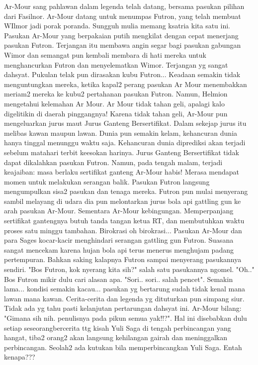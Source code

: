 \documentclass[a4paper,11pt,final]{article}
\begin{document}
Ar-Mour sang pahlawan dalam legenda telah datang, bersama pasukan pilihan dari Fasilnor. Ar-Mour datang untuk menumpas Futron, yang telah membuat WIlmor jadi porak poranda. Sungguh mulia memang ksatria kita satu ini.
Pasukan Ar-Mour yang berpakaian putih mengkilat dengan cepat menerjang pasukan Futron. Terjangan itu membawa angin segar bagi pasukan gabungan Wimor dan semangat pun kembali membara di hati mereka untuk menghancurkan Futron dan menyelematkan Wimor.
Terjangan yg sangat dahsyat. Pukulan telak pun dirasakan kubu Futron... Keadaan semakin tidak menguntungkan mereka, ketika kapal2 perang pasukan Ar Mour menembakkan meriam2 mereka ke kubu2 pertahanan pasukan Futron.
Namun, Helmion mengetahui kelemahan Ar Mour. Ar Mour tidak tahan geli, apalagi kalo digelitikin di daerah pinggangnya!
Karena tidak tahan geli, Ar-Mour pun mengeluarkan jurus maut Jurus Ganteng Bersertifikat. Dalam sekejap jurus itu melibas kawan maupun lawan. Dunia pun semakin kelam, kehancuran dunia hanya tinggal menunggu waktu saja.
Kehancuran dunia diprediksi akan terjadi sebelum matahari terbit keesokan harinya. Jurus Ganteng Bersertifikat tidak dapat dikalahkan pasukan Futron. Namun, pada tengah malam, terjadi keajaiban: masa berlaku sertifikat ganteng Ar-Mour habis!
Merasa mendapat momen untuk melakukan serangan balik. Pasukan Futron langsung mengumpulkan sisa2 pasukan dan tenaga mereka. Futron pun mulai menyerang sambil melayang di udara dia pun melontarkan jurus bola api gattling gun ke arah pasukan Ar-Mour.
Sementara Ar-Mour kebingungan. Memperpanjang sertifikat gantengnya butuh tanda tangan ketua RT, dan membutuhkan waktu proses satu minggu tambahan. Birokrasi oh birokrasi...
Pasukan Ar-Mour dan para Sages kocar-kacir menghindari serangan gattling gun Futron. Suasana sangat mencekam karena hujan bola api terus menerus menghujam padang pertempuran. Bahkan saking kalapnya Futron sampai menyerang pasukannya sendiri.
"Bos Futron, kok nyerang kita sih?" salah satu pasukannya ngomel. "Oh.." Bos Futron mikir dulu cari alasan apa. "Sori.. sori.. salah pencet".
Semakin lama... kondisi semakin kacau... pasukan yg bertarung sudah tidak kenal mana lawan mana kawan. Cerita-cerita dan legenda yg dituturkan pun simpang siur. Tidak ada yg tahu pasti kelanjutan pertarungan dahsyat ini.
Ar-Mour bilang: "Gimana sih nih. penulisnya pada pikun semua yak!!?".
Hal ini disebabkan dulu setiap seseorangbercerita ttg kisah Yuli Saga di tengah perbincangan yang hangat, tiba2 orang2 akan langsung kehilangan gairah dan meninggalkan perbincangan. Seolah2 ada kutukan bila memperbincangkan Yuli Saga. Entah kenapa???
\end{document}
